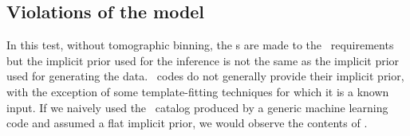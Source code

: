 
\subsection{Violations of the model}


In this test, without tomographic binning, the \pzip s are made to the \lsst\ requirements but the implicit prior used for the inference is not the same as the implicit prior used for generating the data.
\Pzpdf\ codes do not generally provide their implicit prior, with the exception of some template-fitting techniques for which it is a known input.
If we naively used the \pzpdf\ catalog produced by a generic machine learning code and assumed a flat implicit prior, we would observe the contents of .

